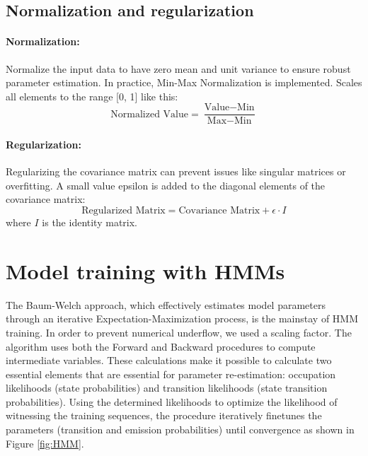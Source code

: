\documentclass{article}
\begin{document}
\subsection{Normalization and regularization}
\paragraph{Normalization:} Normalize the input data to have zero mean and unit variance to ensure robust parameter estimation. In practice, Min-Max Normalization is implemented. Scales all elements to the range [0, 1] like this:
\begin{equation}
\text{Normalized Value} = \frac{\text{Value} - \text{Min}}{\text{Max} - \text{Min}}
\end{equation}

\paragraph{Regularization:} Regularizing the covariance matrix can prevent issues like singular matrices or overfitting. A small value epsilon is added to the diagonal elements of the covariance matrix:
\begin{equation}
\text{Regularized Matrix} = \text{Covariance Matrix} + \epsilon \cdot I
\end{equation}
where $I$ is the identity matrix.







\section{Model training with HMMs}

The Baum-Welch approach, which effectively estimates model parameters through an iterative Expectation-Maximization process, is the mainstay of HMM training. In order to prevent numerical underflow, we used a scaling factor. The algorithm uses both the Forward and Backward procedures to compute intermediate variables. These calculations make it possible to calculate two essential elements that are essential for parameter re-estimation: occupation likelihoods (state probabilities) and transition likelihoods (state transition probabilities). Using the determined likelihoods to optimize the likelihood of witnessing the training sequences, the procedure iteratively finetunes the parameters (transition and emission probabilities) until convergence as shown in Figure \ref{fig:HMM}.
\end{document}
